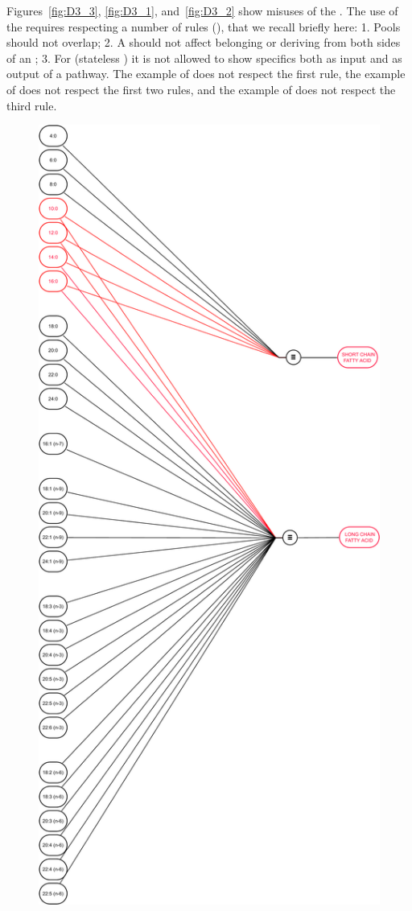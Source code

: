 Figures~\ref{fig:D3_3}, \ref{fig:D3_1}, and~\ref{fig:D3_2} show misuses of the .
The use of the  requires respecting a number of rules (), that we recall briefly here: 1. Pools should not overlap; 2. A  should not affect  belonging or deriving from both sides of an ; 3. For  (stateless ) it is not allowed to show specifics both as input and as output of a pathway.
The example of  does not respect the first rule, the example of  does not respect the first two rules, and the example of  does not respect the third rule.

\begin{figure}
\begin{center}
\includegraphics[scale=0.4]{examples/D3_3}

\end{center}
\end{figure}
